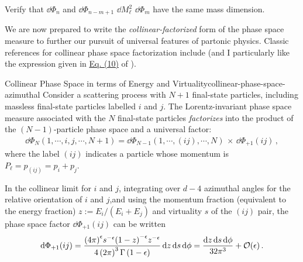 
\begin{exercise}
    Verify that \(\dd\Phi_n\) and \(\dd\Phi_{n-m+1} \,\, \dd M_\ell^2 \,\, \dd \Phi_m\) have the same mass dimension.
\end{exercise}



We are now prepared to write the \textit{collinear-factorized} form of the phase space measure to further our pursuit of universal features of partonic physics.
%
Classic references for collinear phase space factorization include  (and I particularly like the expression given in \href{https://arxiv.org/pdf/1407.3272\#equation.3.10}{Eq. (10)} of ).

\begin{lemma}{Collinear Phase Space in terms of Energy and Virtuality}{collinear-phase-space-azimuthal}
    Consider a scattering process with \(N+1\) final-state particles, including massless final-state particles labelled \(i\) and \(j\).
    The Lorentz-invariant phase space measure associated with the \(N\) final-state particles \emph{factorizes} into the product of the \((N-1)\)-particle phase space and a universal factor:
    \begin{align}
        \dd \Phi_{N}(1, \cdots, i, j, \cdots, N+1)
        =
        \dd \Phi_{N-1}(1, \cdots, (ij), \cdots, N)
        \,
        \times
        \,
        \dd\Phi_{+1}(ij)
        \,,
    \end{align}
    where the label \((ij)\) indicates a particle whose momentum is \(P_\ell = p_{(ij)} = p_i + p_j\).


    In the collinear limit for \(i\) and \(j\), integrating over \(d-4\) azimuthal angles for the relative orientation of \(i\) and \(j\),and using the momentum fraction (equivalent to the energy fraction) \(z := E_i / (E_i + E_j)\) and virtuality \(s\) of the \((ij)\) pair, the phase space factor \(\dd\Phi_{+1}(ij)\) can be written
    \begin{align}
        \label{eq:collinear-phase-space-azimuthal}
        \dd \Phi_{+1}(ij)
        =
        \frac{
            {(4\pi)}^{\epsilon}
            s^{-\epsilon}
            {(1-z)}^{-\epsilon} z^{-\epsilon}
        }
        {4 \le(2 \pi\ri)^3 \Gamma\le(1 - \epsilon\ri)}
        \,
        \dd z \, \dd s \, \dd \phi
        =
        \frac{\dd z \, \dd s \, \dd\phi}{32 \pi^3}
        +
        \mathcal{O}(\epsilon)
        \,.
    \end{align}
\end{lemma}

